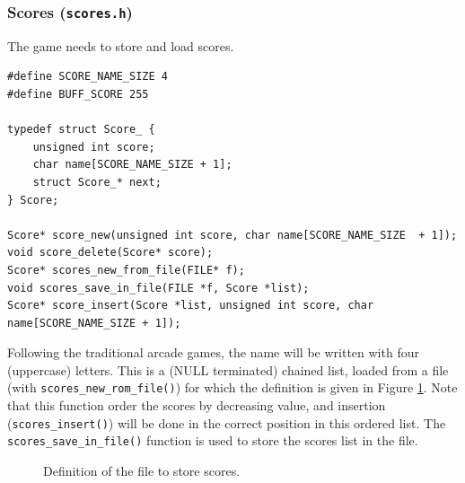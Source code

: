 \documentclass[12pt,a4paper]{article}
\newcommand{\cc}[1]{\texttt{#1}}
\begin{document}
\subsubsection{Scores (\texttt{scores.h})}

The game needs to store and load scores.

\begin{verbatim}
#define SCORE_NAME_SIZE 4
#define BUFF_SCORE 255

typedef struct Score_ {
    unsigned int score;
    char name[SCORE_NAME_SIZE + 1];
    struct Score_* next;
} Score;

Score* score_new(unsigned int score, char name[SCORE_NAME_SIZE  + 1]);
void score_delete(Score* score);
Score* scores_new_from_file(FILE* f);
void scores_save_in_file(FILE *f, Score *list);
Score* score_insert(Score *list, unsigned int score, char name[SCORE_NAME_SIZE + 1]);
\end{verbatim}

Following the traditional arcade games, the name will be written with four (uppercase) letters. This is a (NULL terminated) chained list, loaded from a file (with \cc{scores_new_rom_file()}) for which the definition is given in Figure \ref{fig:def:scores}. Note that this function order the scores by decreasing value, and insertion (\cc{scores_insert()}) will be done in the correct position in this ordered list. The \cc{scores_save_in_file()} function is used to store the scores list in the file.

\begin{figure}[!p]
	\centering
{}
\caption{Definition of the file to store scores.}
\label{fig:def:scores}
\end{figure} 
\end{document}
